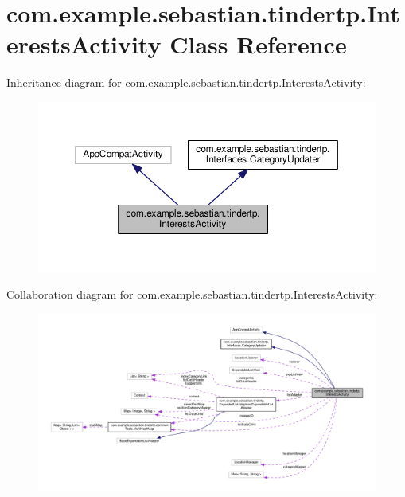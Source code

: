 \hypertarget{classcom_1_1example_1_1sebastian_1_1tindertp_1_1InterestsActivity}{}\section{com.\+example.\+sebastian.\+tindertp.\+Interests\+Activity Class Reference}
\label{classcom_1_1example_1_1sebastian_1_1tindertp_1_1InterestsActivity}


Inheritance diagram for com.\+example.\+sebastian.\+tindertp.\+Interests\+Activity\+:
\nopagebreak
\begin{figure}[H]
\begin{center}
\leavevmode
\includegraphics[width=350pt]{classcom_1_1example_1_1sebastian_1_1tindertp_1_1InterestsActivity__inherit__graph}
\end{center}
\end{figure}


Collaboration diagram for com.\+example.\+sebastian.\+tindertp.\+Interests\+Activity\+:
\nopagebreak
\begin{figure}[H]
\begin{center}
\leavevmode
\includegraphics[width=350pt]{classcom_1_1example_1_1sebastian_1_1tindertp_1_1InterestsActivity__coll__graph}
\end{center}
\end{figure}
